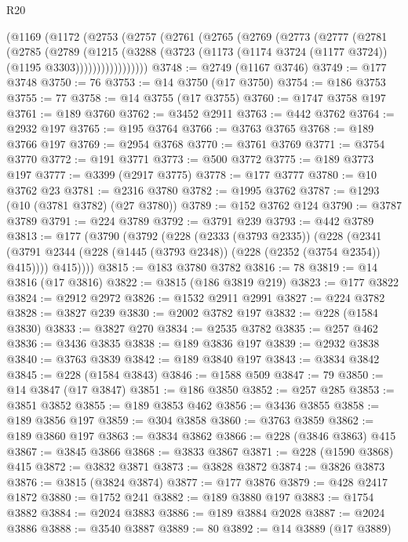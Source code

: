\begin{lexlean}{R20}
\begin{coremodule}
    (@1169
      (@1172
        (@2753
          (@2757
            (@2761
              (@2765
                (@2769
                  (@2773
                    (@2777
                      (@2781
                        (@2785
                          (@2789
                            (@1215
                              (@3288
                                (@3723
                                  (@1173 (@1174 @3724 (@1177 @3724)) (@1195 @3303)))))))))))))))))
@3748 := @2749 (@1167 @3746)
@3749 := @177 @3748
@3750 := 76
@3753 := @14 @3750 (@17 @3750)
@3754 := @186 @3753
@3755 := 77
@3758 := @14 @3755 (@17 @3755)
@3760 := @1747 @3758 @197
@3761 := @189 @3760
@3762 := @3452 @2911
@3763 := @442 @3762
@3764 := @2932 @197
@3765 := @195 @3764
@3766 := @3763 @3765
@3768 := @189 @3766 @197
@3769 := @2954 @3768
@3770 := @3761 @3769
@3771 := @3754 @3770
@3772 := @191 @3771
@3773 := @500 @3772
@3775 := @189 @3773 @197
@3777 := @3399 (@2917 @3775)
@3778 := @177 @3777
@3780 := @10 @3762 @23
@3781 := @2316 @3780
@3782 := @1995 @3762
@3787 := @1293 (@10 (@3781 @3782) (@27 @3780))
@3789 := @152 @3762 @124
@3790 := @3787 @3789
@3791 := @224 @3789
@3792 := @3791 @239
@3793 := @442 @3789
@3813 := @177
    (@3790
      (@3792
        (@228
          (@2333 (@3793 @2335))
          (@228
            (@2341 (@3791 @2344 (@228 (@1445 (@3793 @2348)) (@228 (@2352 (@3754 @2354)) @415))))
            @415))))
@3815 := @183 @3780 @3782
@3816 := 78
@3819 := @14 @3816 (@17 @3816)
@3822 := @3815 (@186 @3819 @219)
@3823 := @177 @3822
@3824 := @2912 @2972
@3826 := @1532 @2911 @2991
@3827 := @224 @3782
@3828 := @3827 @239
@3830 := @2002 @3782 @197
@3832 := @228 (@1584 @3830)
@3833 := @3827 @270
@3834 := @2535 @3782
@3835 := @257 @462
@3836 := @3436 @3835
@3838 := @189 @3836 @197
@3839 := @2932 @3838
@3840 := @3763 @3839
@3842 := @189 @3840 @197
@3843 := @3834 @3842
@3845 := @228 (@1584 @3843)
@3846 := @1588 @509
@3847 := 79
@3850 := @14 @3847 (@17 @3847)
@3851 := @186 @3850
@3852 := @257 @285
@3853 := @3851 @3852
@3855 := @189 @3853 @462
@3856 := @3436 @3855
@3858 := @189 @3856 @197
@3859 := @304 @3858
@3860 := @3763 @3859
@3862 := @189 @3860 @197
@3863 := @3834 @3862
@3866 := @228 (@3846 @3863) @415
@3867 := @3845 @3866
@3868 := @3833 @3867
@3871 := @228 (@1590 @3868) @415
@3872 := @3832 @3871
@3873 := @3828 @3872
@3874 := @3826 @3873
@3876 := @3815 (@3824 @3874)
@3877 := @177 @3876
@3879 := @428 @2417 @1872
@3880 := @1752 @241
@3882 := @189 @3880 @197
@3883 := @1754 @3882
@3884 := @2024 @3883
@3886 := @189 @3884 @2028
@3887 := @2024 @3886
@3888 := @3540 @3887
@3889 := 80
@3892 := @14 @3889 (@17 @3889)

\end{coremodule}
\end{lexlean}
